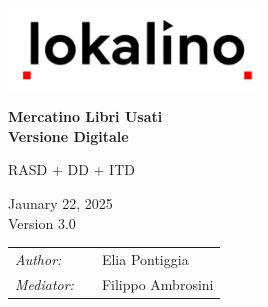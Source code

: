 
\begin{titlepage}
    \begin{center}
        \includegraphics[width=0.5\textwidth]{assets/logo.png}

        \vspace*{2cm}
        \textbf{\huge Mercatino Libri Usati}\\
        \vspace{0.5cm}
        \textbf{\huge Versione Digitale}

        \vspace{0.5cm}
        \LARGE RASD + DD + ITD

        \vspace{1.5cm}

        \vspace{0.5cm}
        Jaunary 22, 2025\\
        Version 3.0

        \vspace{1cm}
        \small
        \begin{table}[b]
            \centering
            \begin{tabular}{l p{.5cm} l}
                \textit{Author:}   &  & Elia Pontiggia    \\
                \textit{Mediator:} &  & Filippo Ambrosini
            \end{tabular}
        \end{table}

    \end{center}
\end{titlepage}